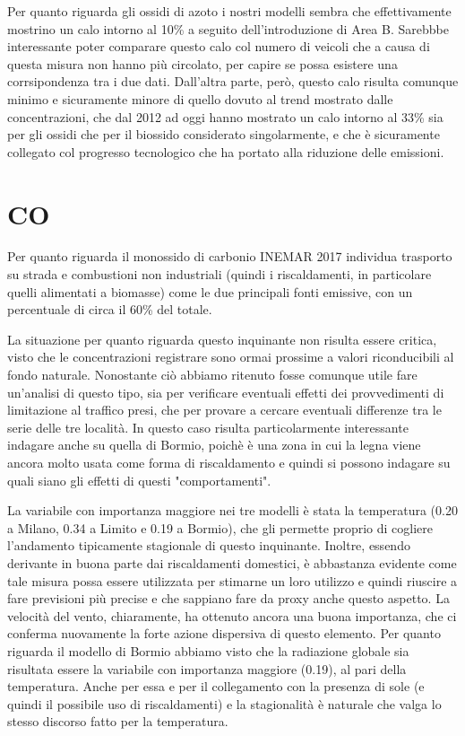 \documentclass[a4paper]{report}
\begin{document}
Per quanto riguarda gli ossidi di azoto i nostri modelli sembra che effettivamente mostrino un calo intorno al 10\% a seguito dell'introduzione di Area B. Sarebbbe interessante poter comparare questo calo col numero di veicoli che a causa di questa misura non hanno più circolato, per capire se possa esistere una corrsipondenza tra i due dati. Dall'altra parte, però, questo calo risulta comunque minimo e sicuramente minore di quello dovuto al trend mostrato dalle concentrazioni, che dal 2012 ad oggi hanno mostrato un calo intorno al 33\% sia per gli ossidi che per il biossido considerato singolarmente, e che è sicuramente collegato col progresso tecnologico che ha portato alla riduzione delle emissioni.

\section{CO}
Per quanto riguarda il monossido di carbonio INEMAR 2017 individua trasporto su strada e combustioni non industriali (quindi i riscaldamenti, in particolare quelli alimentati a biomasse) come le due principali fonti emissive, con un percentuale di circa il 60\% del totale.

La situazione per quanto riguarda questo inquinante non risulta essere critica, visto che le concentrazioni registrare sono ormai prossime a valori riconducibili al fondo naturale. Nonostante ciò abbiamo ritenuto fosse comunque utile fare un'analisi di questo tipo, sia per verificare eventuali effetti dei provvedimenti di limitazione al traffico presi, che per provare a cercare eventuali differenze tra le serie delle tre località. In questo caso risulta particolarmente interessante indagare anche su quella di Bormio, poichè è una zona in cui la legna viene ancora molto usata come forma di riscaldamento e quindi si possono indagare su quali siano gli effetti di questi "comportamenti".

La variabile con importanza maggiore nei tre modelli è stata la temperatura (0.20 a Milano, 0.34 a Limito e 0.19 a Bormio), che gli permette proprio di cogliere l'andamento tipicamente stagionale di questo inquinante. Inoltre, essendo derivante in buona parte dai riscaldamenti domestici, è abbastanza evidente come tale misura possa essere utilizzata per stimarne un loro utilizzo e quindi riuscire a fare previsioni più precise e che sappiano fare da proxy anche questo aspetto.
La velocità del vento, chiaramente, ha ottenuto ancora una buona importanza, che ci conferma nuovamente la forte azione dispersiva di questo elemento.
Per quanto riguarda il modello di Bormio abbiamo visto che la radiazione globale sia risultata essere la variabile con importanza maggiore (0.19), al pari della temperatura. Anche per essa e per il collegamento con la presenza di sole (e quindi il possibile uso di riscaldamenti) e la stagionalità è naturale che valga lo stesso discorso fatto per la temperatura.
\end{document}
